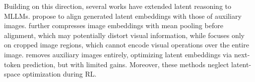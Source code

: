 Building on this direction, several works have extended latent reasoning to MLLMs. \citet{yang2025machine, li2025latent} propose to align generated latent embeddings with those of auxiliary images. \citet{yang2025machine} further compresses image embeddings with mean pooling before alignment, which may potentially distort visual information, while \citet{li2025latent} focuses only on cropped image regions, which cannot encode visual operations over the entire image. \citet{pham2025multimodal} removes auxiliary images entirely, optimizing latent embeddings via next-token prediction, but with limited gains. Moreover, these methods neglect latent-space optimization during RL.
